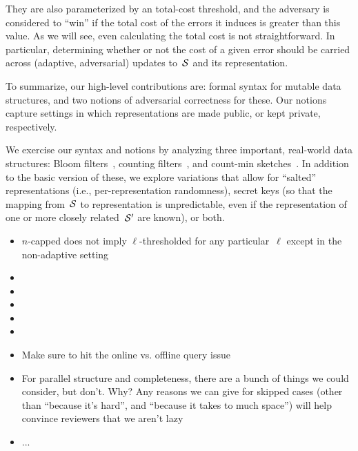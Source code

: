 They are also parameterized by an total-cost threshold, and
the adversary is considered to ``win'' if the total cost of the errors it induces
is greater than this value.  As we will see, even calculating the
total cost is not straightforward.  In particular, determining whether
or not the cost of a given error should be carried across (adaptive,
adversarial) updates to~$\mathcal{S}$ and its representation.

To summarize, our high-level contributions are: formal syntax for
mutable data structures, and two notions of adversarial 
correctness for these.  Our notions capture settings in which representations
are made public, or kept private, respectively.

We exercise our syntax and notions by
analyzing three important, real-world data structures: Bloom
filters~\cite{bloom1970space}, counting filters~\cite{fan2000summary}, and count-min
sketches~\cite{cormode2005improved}. 
In addition to the basic version of these, we
explore variations that allow for ``salted'' representations (i.e.,
per-representation randomness), secret keys (so that the mapping
from~$\mathcal{S}$ to representation is unpredictable, even if the
representation of one or more closely related~$\mathcal{S}'$ are known), or both.

%

\begin{itemize}
\item $n$-capped does not imply $\ell$-thresholded for any
  particular~$\ell$ except in the non-adaptive setting
\item {}
\item {}
\item {}
\item {}
\item {}
\item Make sure to hit the online vs. offline query issue
\item For parallel structure and completeness, there are a bunch of
  things we could consider, but don't.  Why?  Any reasons we can give
  for skipped cases (other than ``because it's hard'', and ``because
  it takes to much space'') will help convince reviewers that we
  aren't lazy
\item ...
\end{itemize}

